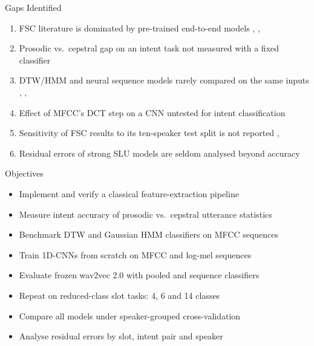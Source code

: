 \documentclass[aspectratio=169,10pt,xcolor=table]{beamer}
\begin{document}
\begin{frame}{Gaps Identified}
\begin{enumerate}\setlength{\itemsep}{6pt}
\item FSC literature is dominated by pre-trained end-to-end models \cite{lugosch2019fsc}, \cite{radfar2020transformer}, \cite{yang2021superb}
\item Prosodic vs.\ cepstral gap on an intent task not measured with a fixed classifier \cite{davis1980mfcc}
\item DTW/HMM and neural sequence models rarely compared on the same inputs \cite{sakoe1978dtw}, \cite{rabiner1989hmm}, \cite{abdelhamid2014cnn}
\item Effect of MFCC's DCT step on a CNN untested for intent classification \cite{mohamed2012understanding}
\item Sensitivity of FSC results to its ten-speaker test split is not reported \cite{lugosch2019fsc}, \cite{yang2021superb}
\item Residual errors of strong SLU models are seldom analysed beyond accuracy
\end{enumerate}
\end{frame}

\begin{frame}{Objectives}
\begin{itemize}\setlength{\itemsep}{6pt}
\item Implement and verify a classical feature-extraction pipeline
\item Measure intent accuracy of prosodic vs.\ cepstral utterance statistics
\item Benchmark DTW and Gaussian HMM classifiers on MFCC sequences
\item Train 1D-CNNs from scratch on MFCC and log-mel sequences
\item Evaluate frozen wav2vec 2.0 with pooled and sequence classifiers
\item Repeat on reduced-class slot tasks: 4, 6 and 14 classes
\item Compare all models under speaker-grouped cross-validation
\item Analyse residual errors by slot, intent pair and speaker
\end{itemize}
\end{frame}
\end{document}
